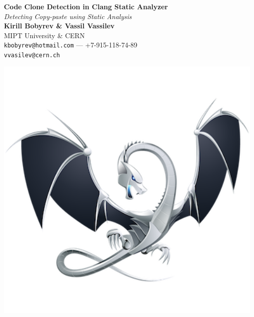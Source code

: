 \documentclass[a0,portrait]{a0poster}
\begin{document}


\begin{minipage}[b]{0.75\linewidth}
\veryHuge \color{NavyBlue} \textbf{Code Clone Detection in Clang Static Analyzer} \color{Black}\\ %
\Huge\textit{Detecting Copy-paste using Static Analysis}\\[2cm] %
\huge \textbf{Kirill Bobyrev \& Vassil Vassilev}\\[0.5cm] %
\huge MIPT University \& CERN\\[0.4cm] %
\Large \texttt{kbobyrev@hotmail.com} --- +7-915-118-74-89\\
\Large \texttt{vvasilev@cern.ch}\\
\end{minipage}
%
\begin{minipage}[b]{0.25\linewidth}
\includegraphics[width=20cm]{logo.png}\\
\end{minipage}
\end{document}
